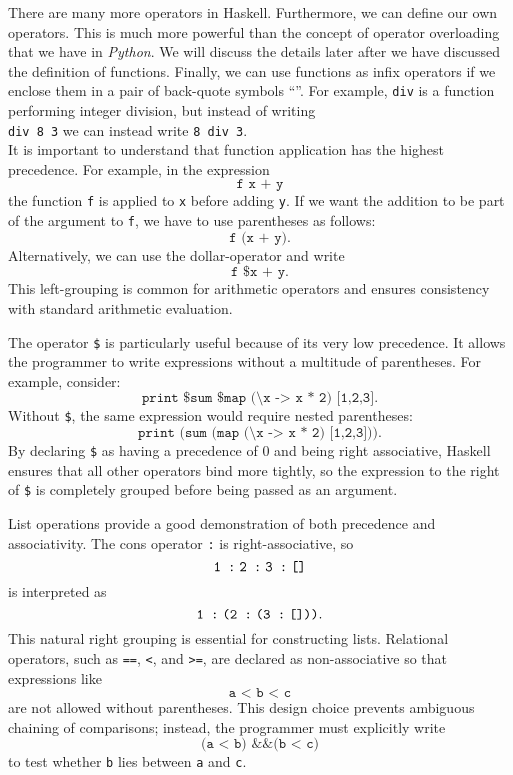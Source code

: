 There are many more operators in Haskell.  Furthermore, we can define our own operators.  This is much more
powerful  than the concept of operator overloading that we have in \textsl{Python}.  We will discuss the
details later after we have discussed the definition of functions.  Finally, we can use functions as infix
operators if we enclose them in a pair of back-quote symbols ``\texttt{\textasciigrave}''.  For example,
\texttt{div} is a function performing integer division, but instead of writing
\\[0.2cm]
\hspace*{1.3cm}
\texttt{div 8 3} \quad we can instead write \quad \texttt{8 \textasciigrave div\textasciigrave\  3}.
\\[0.2cm]
It is important to understand that function application has the highest precedence. For example, in the expression
\[
\texttt{f x + y}
\]
the function \texttt{f} is applied to \texttt{x} before adding \texttt{y}. If we want the
addition to be part of the argument to \texttt{f}, we have to use parentheses as follows: 
\[
\texttt{f (x + y)}.
\]
Alternatively, we can use the dollar-operator  and write
\[
\texttt{f \$ x + y}.
\]
This left-grouping is common for arithmetic operators and ensures consistency with standard arithmetic evaluation.

The operator \texttt{\$} is particularly useful because of its very low precedence. It allows the programmer to write expressions without a multitude of parentheses. For example, consider:
\[
\texttt{print \$ sum \$ map (\textbackslash x -> x * 2) [1,2,3]}.
\]
Without \texttt{\$}, the same expression would require nested parentheses:
\[
\texttt{print (sum (map (\textbackslash x -> x * 2) [1,2,3]))}.
\]
By declaring \texttt{\$} as having a precedence of 0 and being right associative, Haskell ensures that all
other operators bind more tightly, so the expression to the right of \texttt{\$} is completely grouped before
being passed as an argument. 

List operations provide a good demonstration of both precedence and associativity. The cons operator \texttt{:}
is right-associative, so 
\[
\texttt{1 :\;2 :\;3 :\;[]}
\]
is interpreted as
\[
\texttt{1 :\;(2 :\;(3 :\;[]))}.
\]
This natural right grouping is essential for constructing lists.
Relational operators, such as \texttt{==}, \texttt{<}, and \texttt{>=}, are declared as non-associative so that
expressions like 
\[
\texttt{a < b < c}
\]
are not allowed without parentheses. This design choice prevents ambiguous chaining of comparisons; instead,
the programmer must explicitly write 
\[
\texttt{(a < b) \&\& (b < c)}
\]
to test whether \texttt{b} lies between \texttt{a} and \texttt{c}.

